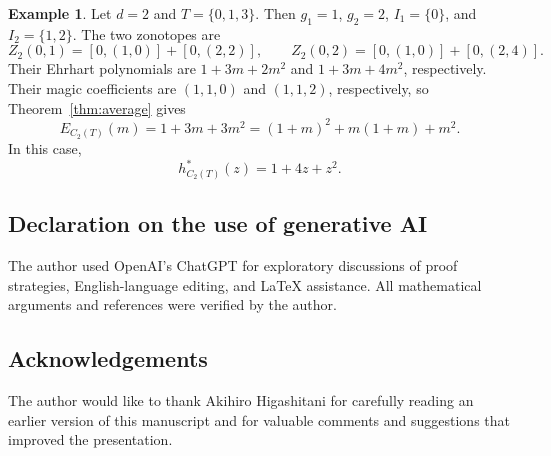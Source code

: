 \documentclass[a4paper,reqno,11pt,oneside]{amsart}
\theoremstyle{definition}
\newtheorem{ex}[thm]{Example}
\theoremstyle{remark}
\begin{document}
\begin{ex}\label{ex:gaps}
Let $d=2$ and $T=\{0,1,3\}$. Then $g_1=1$, $g_2=2$, $I_1=\{0\}$, and $I_2=\{1,2\}$. The two zonotopes are
\[
Z_2(0,1)=[0,(1,0)]+[0,(2,2)],\qquad Z_2(0,2)=[0,(1,0)]+[0,(2,4)].
\]
Their Ehrhart polynomials are $1+3m+2m^2$ and $1+3m+4m^2$, respectively. Their magic coefficients are $(1,1,0)$ and $(1,1,2)$, respectively, so Theorem~\ref{thm:average} gives
\[
E_{C_2(T)}(m)=1+3m+3m^2=(1+m)^2+m(1+m)+m^2.
\]
In this case,
\[
h^\ast_{C_2(T)}(z)=1+4z+z^2.
\]
\end{ex}

\subsection*{Declaration on the use of generative AI}
The author used OpenAI's ChatGPT for exploratory discussions of proof strategies, English-language editing, and \LaTeX{} assistance. All mathematical arguments and references were verified by the author.

\subsection*{Acknowledgements}
The author would like to thank Akihiro Higashitani for carefully reading an earlier version of this manuscript and for valuable comments and suggestions that improved the presentation.

 

\end{document}
